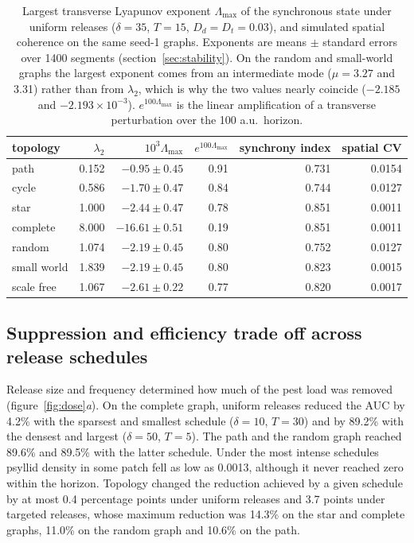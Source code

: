 \begin{table}[t]
\centering
\caption{Largest transverse Lyapunov exponent $\Lambda_{\max}$ of the synchronous state under uniform releases ($\delta=35$, $T=15$, $D_d=D_t=0.03$), and simulated spatial coherence on the same seed-1 graphs. Exponents are means $\pm$ standard errors over 1400 segments (section~\ref{sec:stability}). On the random and small-world graphs the largest exponent comes from an intermediate mode ($\mu = 3.27$ and 3.31) rather than from $\lambda_2$, which is why the two values nearly coincide ($-2.185$ and $-2.193\times10^{-3}$). $e^{100\Lambda_{\max}}$ is the linear amplification of a transverse perturbation over the 100 a.u.\ horizon.}
\label{tab:stability}
\small
\begin{tabular}{lrrrrr}
\toprule
topology & $\lambda_2$ & $10^{3}\Lambda_{\max}$ & $e^{100\Lambda_{\max}}$ & synchrony index & spatial CV\\
\midrule
path        & 0.152 &  $-0.95 \pm 0.45$ & 0.91 & 0.731 & 0.0154\\
cycle       & 0.586 &  $-1.70 \pm 0.47$ & 0.84 & 0.744 & 0.0127\\
star        & 1.000 &  $-2.44 \pm 0.47$ & 0.78 & 0.851 & 0.0011\\
complete    & 8.000 & $-16.61 \pm 0.51$ & 0.19 & 0.851 & 0.0011\\
random      & 1.074 &  $-2.19 \pm 0.45$ & 0.80 & 0.752 & 0.0127\\
small world & 1.839 &  $-2.19 \pm 0.45$ & 0.80 & 0.823 & 0.0015\\
scale free  & 1.067 &  $-2.61 \pm 0.22$ & 0.77 & 0.820 & 0.0017\\
\bottomrule
\end{tabular}
\end{table}

\subsection{Suppression and efficiency trade off across release schedules}
\label{sec:res-dose}

Release size and frequency determined how much of the pest load was removed (figure~\ref{fig:dose}\emph{a}). On the complete graph, uniform releases reduced the AUC by 4.2\% with the sparsest and smallest schedule ($\delta = 10$, $T = 30$) and by 89.2\% with the densest and largest ($\delta = 50$, $T = 5$). The path and the random graph reached 89.6\% and 89.5\% with the latter schedule. Under the most intense schedules psyllid density in some patch fell as low as 0.0013, although it never reached zero within the horizon. Topology changed the reduction achieved by a given schedule by at most 0.4 percentage points under uniform releases and 3.7 points under targeted releases, whose maximum reduction was 14.3\% on the star and complete graphs, 11.0\% on the random graph and 10.6\% on the path.

